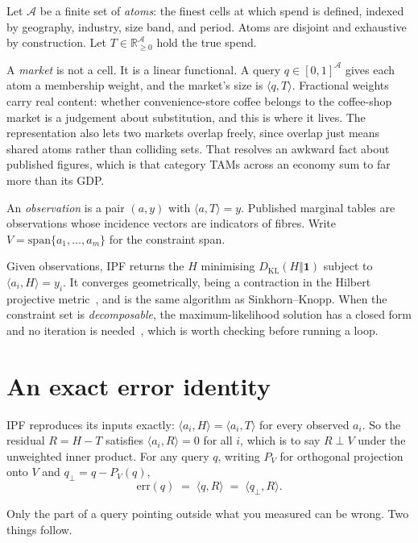 \documentclass[11pt]{article}
\begin{document}
Let $\mathcal{A}$ be a finite set of \emph{atoms}: the finest cells at which
spend is defined, indexed by geography, industry, size band, and period. Atoms
are disjoint and exhaustive by construction. Let
$T \in \mathbb{R}_{\ge 0}^{\mathcal{A}}$ hold the true spend.

A \emph{market} is not a cell. It is a linear functional. A query
$q \in [0,1]^{\mathcal{A}}$ gives each atom a membership weight, and the market's
size is $\langle q, T\rangle$. Fractional weights carry real content: whether
convenience-store coffee belongs to the coffee-shop market is a judgement about
substitution, and this is where it lives. The representation also lets two
markets overlap freely, since overlap just means shared atoms rather than
colliding sets. That resolves an awkward fact about published figures, which is
that category TAMs across an economy sum to far more than its GDP.

An \emph{observation} is a pair $(a,y)$ with $\langle a, T\rangle = y$. Published
marginal tables are observations whose incidence vectors are indicators of
fibres. Write $V = \mathrm{span}\{a_1,\dots,a_m\}$ for the constraint span.

Given observations, IPF returns the $H$ minimising
$D_{\mathrm{KL}}(H \Vert \mathbf{1})$ subject to
$\langle a_i, H\rangle = y_i$. It converges geometrically, being a contraction in
the Hilbert projective metric~\cite{sinkhornrate}, and is the same algorithm as
Sinkhorn--Knopp. When the constraint set is \emph{decomposable}, the
maximum-likelihood solution has a closed form and no iteration is
needed~\cite{decomposable}, which is worth checking before running a loop.

\section{An exact error identity}
\label{sec:identity}

IPF reproduces its inputs exactly: $\langle a_i, H\rangle = \langle a_i, T\rangle$
for every observed $a_i$. So the residual $R = H - T$ satisfies
$\langle a_i, R\rangle = 0$ for all $i$, which is to say $R \perp V$ under the
unweighted inner product. For any query $q$, writing $P_V$ for orthogonal
projection onto $V$ and $q_\perp = q - P_V(q)$,
\begin{equation}
  \mathrm{err}(q) \;=\; \langle q, R\rangle \;=\; \langle q_\perp, R\rangle .
  \label{eq:identity}
\end{equation}

Only the part of a query pointing outside what you measured can be wrong. Two
things follow.
\end{document}

